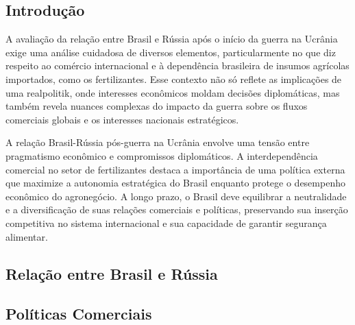 \documentclass[article,12pt,oneside,a4paper,english,brazil,sumario=tradicional]{abntex2}
\begin{document}
\renewcommand\thesubsection{\arabic{subsection}}

\subsection{Introdução}

A avaliação da relação entre Brasil e Rússia após o início da guerra na Ucrânia exige uma análise cuidadosa de diversos elementos, particularmente no que diz respeito ao comércio internacional e à dependência brasileira de insumos agrícolas importados, como os fertilizantes. Esse contexto não só reflete as implicações de uma realpolitik, onde interesses econômicos moldam decisões diplomáticas, mas também revela nuances complexas do impacto da guerra sobre os fluxos comerciais globais e os interesses nacionais estratégicos.

A relação Brasil-Rússia pós-guerra na Ucrânia envolve uma tensão entre pragmatismo econômico e compromissos diplomáticos. A interdependência comercial no setor de fertilizantes destaca a importância de uma política externa que maximize a autonomia estratégica do Brasil enquanto protege o desempenho econômico do agronegócio. A longo prazo, o Brasil deve equilibrar a neutralidade e a diversificação de suas relações comerciais e políticas, preservando sua inserção competitiva no sistema internacional e sua capacidade de garantir segurança alimentar.

\subsection{Relação entre Brasil e Rússia}

\subsection{Políticas Comerciais}
\end{document}
